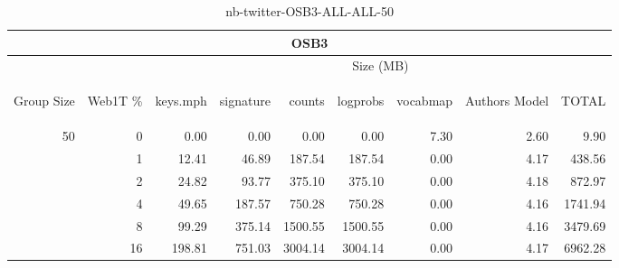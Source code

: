 \begin{center}
\begin{table}[htbp]
\begin{tabular}{ | r | r | r | r | r | r | r | r | r |}
\hline
\multicolumn{9}{|c|}{OSB3}\\
\hline
 & & \multicolumn{7}{|c|}{Size (MB)}\\ \cline{3-9}
\begin{sideways}Group Size\end{sideways} & \begin{sideways}Web1T \% \end{sideways} & \begin{sideways}keys.mph\end{sideways} & \begin{sideways}signature\end{sideways} & \begin{sideways}counts\end{sideways} & \begin{sideways}logprobs\end{sideways} & \begin{sideways}vocabmap\end{sideways} & \begin{sideways}Authors Model \end{sideways} & \begin{sideways}TOTAL\end{sideways}\\
\hline
\multirow{5}{*}{50}
 & 0 & 0.00 & 0.00 & 0.00 & 0.00 & 7.30 & 2.60 & 9.90\\ \cline{2-9}
 & 1 & 12.41 & 46.89 & 187.54 & 187.54 & 0.00 & 4.17 & 438.56\\ \cline{2-9}
 & 2 & 24.82 & 93.77 & 375.10 & 375.10 & 0.00 & 4.18 & 872.97\\ \cline{2-9}
 & 4 & 49.65 & 187.57 & 750.28 & 750.28 & 0.00 & 4.16 & 1741.94\\ \cline{2-9}
 & 8 & 99.29 & 375.14 & 1500.55 & 1500.55 & 0.00 & 4.16 & 3479.69\\ \cline{2-9}
 & 16 & 198.81 & 751.03 & 3004.14 & 3004.14 & 0.00 & 4.17 & 6962.28\\ \cline{2-9}
\hline
\end{tabular}
\caption{nb-twitter-OSB3-ALL-ALL-50}
\label{table:nb-twitter-OSB3-ALL-ALL-50}
\end{table}
\end{center}

